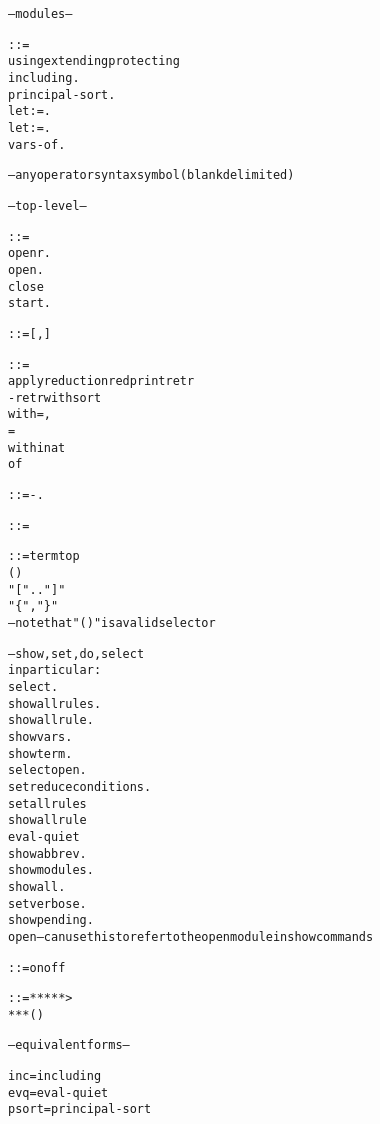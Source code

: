 \begin{alltt}
--- modules ---

   ::= \omt \alt
        \lsg using \alt extending \alt protecting \alt
            including \rsg {} . \alt
        principal-sort  . \alt
        let  \lopt :  \ropt =  . \alt
        let  \lopt :  \ropt = . \alt
        vars-of \lopt {} \ropt .

   --- any operator syntax symbol (blank delimited)

--- top-level ---

   ::= \lsg \omt \alt
        openr \lopt {} \ropt . \alt
        open \lopt {} \ropt . \alt
        close \alt
        start  . \alt
        \rsg\itr

   ::= [ \itr{\lsg},\itr\rsg\itd ]

   ::=
        apply \lsg reduction \alt red \alt print \alt retr \alt
            -retr with sort  \alt
             \lopt with  = ,
                  = \rsg\itd\ropt \rsg
        \lsg within \alt at \rsg
         \lsg of  \rsg\itd

   ::= {\lopt}-\ropt\lopt{}\ropt.

   ::=  \alt {}

   ::= term \alt top \alt
        (\itr) \alt
        "["  \lopt ..  \ropt "]" \alt
        "\{",\rsg\itr"\}"
        --- note that "()" is a valid selector

   --- show, set, do, select
        in particular:
            select \lopt {} \ropt .
            show {\lopt}all\ropt rules \lopt {} \ropt .
            show {\lopt}all\ropt rule  .
            show vars .
            show term .
            select open .
            set reduce conditions  .
            set all rules 
            show {\lopt}all\ropt rule 
            eval-quiet 
            show abbrev \lopt {} \ropt .
            show modules .
            show all {\lopt}\ropt .
            set verbose  .
            show pending .
        open --- can use this to refer to the open module in show commands

   ::= on \alt off

   ::= ***  \alt ***>  \alt
        *** (  )

--- equivalent forms ---

  inc = including
  evq = eval-quiet
  psort = principal-sort
\end{alltt}

